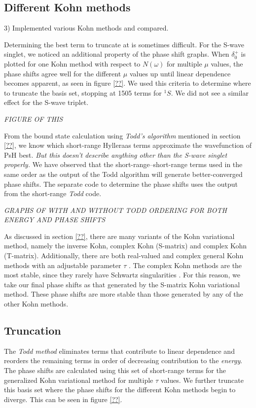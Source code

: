 \documentclass[preprint,showpacs,preprintnumbers,amsmath,amssymb]{revtex4}
\begin{document}
\subsection{Different Kohn methods}
3) Implemented various Kohn methods and compared.

Determining the best term to truncate at is sometimes difficult. For the S-wave singlet, we noticed an additional property of the phase shift graphs. When $\delta_0^+$ is plotted for one Kohn method with respect to $N(\omega)$ for multiple $\mu$ values, the phase shifts agree well for the different $\mu$ values up until linear dependence becomes apparent, as seen in figure \ref{??}. We used this criteria to determine where to truncate the basis set, stopping at 1505 terms for $^1S$. We did not see a similar effect for the S-wave triplet.

\emph{FIGURE OF THIS}

From the bound state calculation using \emph{Todd's algorithm} mentioned in section \ref{??}, we know which short-range Hylleraas terms approximate the wavefunction of PsH best. \emph{But this doesn't describe anything other than the S-wave singlet properly.} We have observed that the short-range--short-range terms used in the same order as the output of the Todd algorithm will generate better-converged phase shifts. The separate code to determine the phase shifts uses the output from the short-range \emph{Todd} code.

\emph{GRAPHS OF WITH AND WITHOUT TODD ORDERING FOR BOTH ENERGY AND PHASE SHIFTS}

As discussed in section \ref{??}, there are many variants of the Kohn variational method, namely the inverse Kohn, complex Kohn (S-matrix) and complex Kohn (T-matrix). Additionally, there are both real-valued and complex general Kohn methods with an adjustable parameter $\tau$ \cite{??}. The complex Kohn methods are the most stable, since they rarely have Schwartz singularities \cite{CooperOrLucchese??}. For this reason, we take our final phase shifts as that generated by the S-matrix Kohn variational method. These phase shifts are more stable than those generated by any of the other Kohn methods.

\subsection{Truncation}
The \emph{Todd method} eliminates terms that contribute to linear dependence and reorders the remaining terms in order of decreasing contribution to the \emph{energy}. The phase shifts are calculated using this set of short-range terms for the generalized Kohn variational method for multiple $\tau$ values. We further truncate this basis set where the phase shifts for the different Kohn methods begin to diverge. This can be seen in figure \ref{??}.
\end{document}
